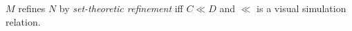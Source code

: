 





$M$ refines $N$ by \textit{set-theoretic refinement} iff $C \ll D$ and $\ll$ is a visual simulation relation.

